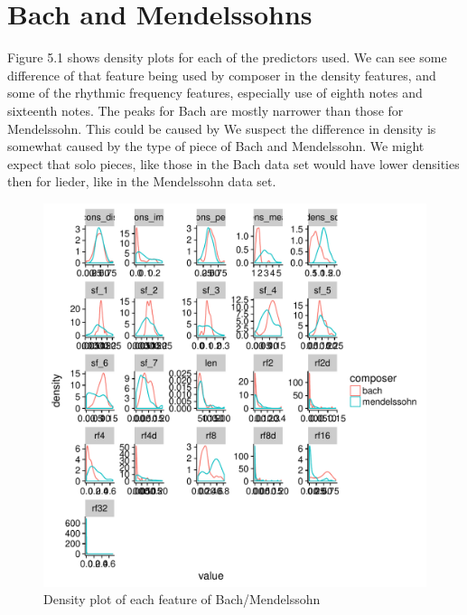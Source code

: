 \documentclass[12pt,twoside]{reedthesis}
\theoremstyle{definition}
\theoremstyle{definition}
\theoremstyle{definition}
\theoremstyle{remark}
\begin{document}
\section{Bach and Mendelssohns}\label{bach-and-mendelssohns}

Figure 5.1 shows density plots for each of the predictors used. We can
see some difference of that feature being used by composer in the
density features, and some of the rhythmic frequency features,
especially use of eighth notes and sixteenth notes. The peaks for Bach
are mostly narrower than those for Mendelssohn. This could be caused by
We suspect the difference in density is somewhat caused by the type of
piece of Bach and Mendelssohn. We might expect that solo pieces, like
those in the Bach data set would have lower densities then for lieder,
like in the Mendelssohn data set.
\begin{figure}[H]
\centering
\includegraphics[scale = .5]{images/distribution_b.pdf}
\caption{Density plot of each feature of Bach/Mendelssohn}
\label{subd}
\end{figure}
\end{document}
